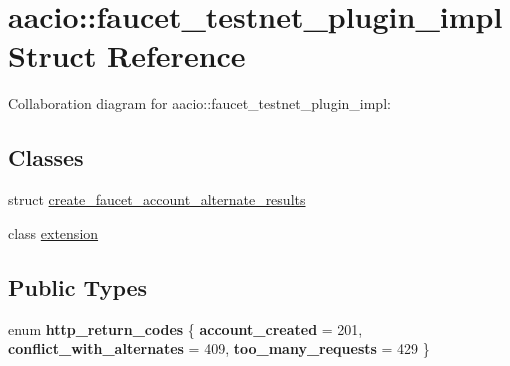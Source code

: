 \hypertarget{structaacio_1_1faucet__testnet__plugin__impl}{}\section{aacio\+:\+:faucet\+\_\+testnet\+\_\+plugin\+\_\+impl Struct Reference}
\label{structaacio_1_1faucet__testnet__plugin__impl}


Collaboration diagram for aacio\+:\+:faucet\+\_\+testnet\+\_\+plugin\+\_\+impl\+:
\subsection*{Classes}
\begin{DoxyCompactItemize}
\item 
struct \mbox{\hyperlink{structaacio_1_1faucet__testnet__plugin__impl_1_1create__faucet__account__alternate__results}{create\+\_\+faucet\+\_\+account\+\_\+alternate\+\_\+results}}
\item 
class \mbox{\hyperlink{classaacio_1_1faucet__testnet__plugin__impl_1_1extension}{extension}}
\end{DoxyCompactItemize}
\subsection*{Public Types}
\begin{DoxyCompactItemize}
\item 
\mbox{\label{structaacio_1_1faucet__testnet__plugin__impl_a8d5389eb02ba9d47862d4670793c7343}} 
enum {\bfseries http\+\_\+return\+\_\+codes} \{ {\bfseries account\+\_\+created} = 201, 
{\bfseries conflict\+\_\+with\+\_\+alternates} = 409, 
{\bfseries too\+\_\+many\+\_\+requests} = 429
 \}
\end{DoxyCompactItemize}
